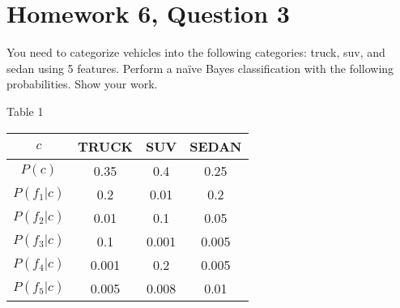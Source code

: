\documentclass{article}
\begin{document}
\maketitle

\newcommand{\A}{x_1 \, and \, \dots \, x_n}

\makeatletter
\renewcommand{\@seccntformat}[1]{}
\makeatother

\section{Homework 6, Question 3}\label{abstract}

You need to categorize vehicles into the following categories: truck, suv, and sedan using 5 features. Perform a naïve Bayes classification with the following probabilities. Show your work.
	 	 

% 
%

\begin{center} Table 1 \end{center}

\begin{center}
 \begin{tabular}{||c c c c ||} 
 \hline
 $c$ & TRUCK & SUV & SEDAN \\ [0.5ex] 
 \hline\hline
 $P(c)$&0.35&0.4&0.25\\
 \hline
 $P(f_1|c)$&0.2&0.01&0.2\\
 \hline
 $P(f_2|c)$&0.01&0.1&0.05\\
 \hline
 $P(f_3|c)$&0.1&0.001&0.005\\
 \hline
 $P(f_4|c)$&0.001&0.2&0.005\\
 \hline
 $P(f_5|c)$ & 0.005& 0.008 & 0.01\\ [1ex] 
 \hline
\end{tabular}
\end{center}



%
%



\newcommand{\agb}[2]{P(#1|#2)}
\newcommand{\bayes}[2]{\agb{#1}{#2} = \frac{P(#1) \agb{#2}{#1}}{P(#2)}}
\end{document}
